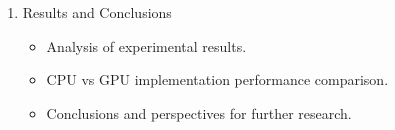 \documentclass[12pt]{article}
\begin{document}
\begin{enumerate}[label=\arabic*., leftmargin=*, itemsep=0.1cm]
\item {Results and Conclusions}
\begin{itemize}[noitemsep, topsep=0pt]
    \item Analysis of experimental results.
    \item CPU vs GPU implementation performance comparison.
    \item Conclusions and perspectives for further research.
\end{itemize}
\end{enumerate}

\vspace{0.5cm}
\end{document}
